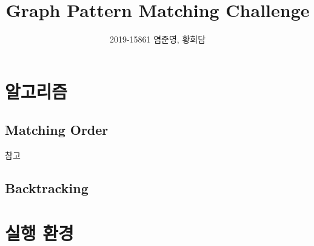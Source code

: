 \documentclass{article}
\author{2019-15861 염준영, 황희담}
\title{Graph Pattern Matching Challenge}
\begin{document}
\maketitle
\section{알고리즘}
\subsection{Matching Order}
참고\cite{한명지2018AEAf}
\cite{10.1145/3299869.3319880}
\cite{김현준2020FGQP}
\subsection{Backtracking}
\section{실행 환경}
    
\printbibliography
\end{document}
